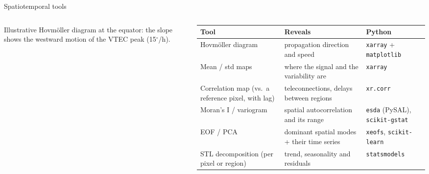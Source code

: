 \documentclass{beamer}
\begin{document}
\begin{frame}{Spatiotemporal tools}
    \begin{columns}[c]
        \centering

        {\tiny Illustrative Hovmöller diagram at the equator: the slope shows the westward motion of the VTEC peak (15$^\circ$/h).\par}

        \tiny
        \renewcommand{\arraystretch}{1.25}
        \begin{tabularx}{\columnwidth}{@{}>{\raggedright}p{2.1cm} >{\raggedright}X >{\raggedright\arraybackslash}p{1.9cm}@{}}
            \toprule
            \textbf{Tool} & \textbf{Reveals} & \textbf{Python} \\
            \midrule
            Hovmöller diagram & propagation direction and speed & \texttt{xarray} + \texttt{matplotlib} \\
            Mean / std maps & where the signal and the variability are & \texttt{xarray} \\
            Correlation map (vs.\ a reference pixel, with lag) & teleconnections, delays between regions & \texttt{xr.corr} \\
            Moran's I / variogram & spatial autocorrelation and its range & \texttt{esda} (PySAL), \texttt{scikit-gstat} \\
            EOF / PCA & dominant spatial modes + their time series & \texttt{xeofs}, \texttt{scikit-learn} \\
            STL decomposition (per pixel or region) & trend, seasonality and residuals & \texttt{statsmodels} \\
            \bottomrule
        \end{tabularx}
    \end{columns}
\end{frame}
\end{document}

